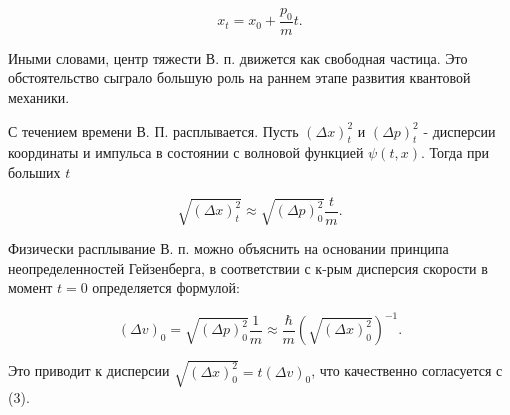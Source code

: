 \documentclass[10pt]{article}
\begin{document}
\[

x_{t}=x_{0}+\frac{p_{0}}{m} t .

\]



Иными словами, центр тяжести В. п. движется как свободная частица. Это обстоятельство сыграло большую роль на раннем этапе развития квантовой механики.



С течением времени В. П. расплывается. Пусть $(\Delta x)_{t}^{2}$ и $(\Delta p)_{t}^{2}$ - дисперсии координаты и импульса в состоянии с волновой функцией $\psi(t, x)$. Тогда при больших $t$



\[

\sqrt{(\Delta x)_{t}^{2}} \approx \sqrt{(\Delta p)_{0}^{2}} \frac{t}{m} .

\]



Физически расплывание В. п. можно объяснить на основании принципа неопределенностей Гейзенберга, в соответствии с к-рым дисперсия скорости в момент $t=0$ определяется формулой:



\[

(\Delta v)_{0}=\sqrt{(\Delta p)_{0}^{2}} \frac{1}{m} \approx \frac{\hbar}{m}\left(\sqrt{(\Delta x)_{0}^{2}}\right)^{-1} .

\]



Это приводит к дисперсии $\sqrt{(\Delta x)_{0}^{2}}=t(\Delta v)_{0}$, что качественно согласуется с (3).
\end{document}
